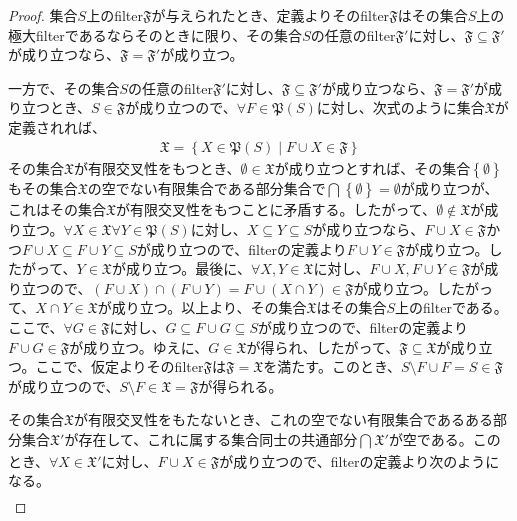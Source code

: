 \documentclass[dvipdfmx]{jsarticle}
\begin{document}
\begin{proof}
集合$S$上のfilter$\mathfrak{F}$が与えられたとき、定義よりそのfilter$\mathfrak{F}$はその集合$S$上の極大filterであるならそのときに限り、その集合$S$の任意のfilter$\mathfrak{F}'$に対し、$\mathfrak{F \subseteq}\mathfrak{F}'$が成り立つなら、$\mathfrak{F} = \mathfrak{F}'$が成り立つ。\par
一方で、その集合$S$の任意のfilter$\mathfrak{F}'$に対し、$\mathfrak{F \subseteq}\mathfrak{F}'$が成り立つなら、$\mathfrak{F} = \mathfrak{F}'$が成り立つとき、$S \in \mathfrak{F}$が成り立つので、$\forall F \in \mathfrak{P}(S)$に対し、次式のように集合$\mathfrak{X}$が定義されれば、
\begin{align*}
\mathfrak{X} =\left\{ X \in \mathfrak{P}(S) \middle| F \cup X \in \mathfrak{F} \right\}
\end{align*}
その集合$\mathfrak{X}$が有限交叉性をもつとき、$\emptyset \in \mathfrak{X}$が成り立つとすれば、その集合$\left\{ \emptyset \right\}$もその集合$\mathfrak{X}$の空でない有限集合である部分集合で$\bigcap_{} \left\{ \emptyset \right\} = \emptyset$が成り立つが、これはその集合$\mathfrak{X}$が有限交叉性をもつことに矛盾する。したがって、$\emptyset \notin \mathfrak{X}$が成り立つ。$\forall X \in \mathfrak{X\forall}Y \in \mathfrak{P}(S)$に対し、$X \subseteq Y \subseteq S$が成り立つなら、$F \cup X \in \mathfrak{F}$かつ$F \cup X \subseteq F \cup Y \subseteq S$が成り立つので、filterの定義より$F \cup Y \in \mathfrak{F}$が成り立つ。したがって、$Y \in \mathfrak{X}$が成り立つ。最後に、$\forall X,Y \in \mathfrak{X}$に対し、$F \cup X,F \cup Y \in \mathfrak{F}$が成り立つので、$(F \cup X) \cap (F \cup Y) = F \cup (X \cap Y)\in \mathfrak{F}$が成り立つ。したがって、$X \cap Y \in \mathfrak{X}$が成り立つ。以上より、その集合$\mathfrak{X}$はその集合$S$上のfilterである。ここで、$\forall G \in \mathfrak{F}$に対し、$G \subseteq F \cup G \subseteq S$が成り立つので、filterの定義より$F \cup G \in \mathfrak{F}$が成り立つ。ゆえに、$G \in \mathfrak{X}$が得られ、したがって、$\mathfrak{F \subseteq X}$が成り立つ。ここで、仮定よりそのfilter$\mathfrak{F}$は$\mathfrak{F = X}$を満たす。このとき、$S \setminus F \cup F = S \in \mathfrak{F}$が成り立つので、$S \setminus F \in \mathfrak{X = F}$が得られる。\par
その集合$\mathfrak{X}$が有限交叉性をもたないとき、これの空でない有限集合であるある部分集合$\mathfrak{X}'$が存在して、これに属する集合同士の共通部分$\bigcap_{} \mathfrak{X}'$が空である。このとき、$\forall X \in \mathfrak{X}'$に対し、$F \cup X \in \mathfrak{F}$が成り立つので、filterの定義より次のようになる。
\begin{align*}

\end{align*}
\end{proof}
\end{document}
